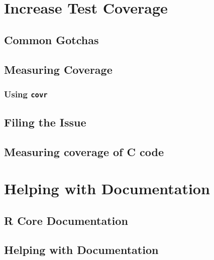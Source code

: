 \documentclass[]{book}
\begin{document}
\hypertarget{increase-test-coverage}{%
\chapter{Increase Test Coverage}\label{increase-test-coverage}}

\hypertarget{common-gotchas}{%
\section{Common Gotchas}\label{common-gotchas}}

\hypertarget{measuring-coverage}{%
\section{Measuring Coverage}\label{measuring-coverage}}

\hypertarget{using-covr}{%
\subsection{\texorpdfstring{Using \texttt{covr}}{Using covr}}\label{using-covr}}

\hypertarget{filing-the-issue}{%
\section{Filing the Issue}\label{filing-the-issue}}

\hypertarget{measuring-coverage-of-c-code}{%
\section{Measuring coverage of C code}\label{measuring-coverage-of-c-code}}

\hypertarget{helping-with-documentation}{%
\chapter{Helping with Documentation}\label{helping-with-documentation}}

\hypertarget{r-core-documentation}{%
\section{R Core Documentation}\label{r-core-documentation}}

\hypertarget{helping-with-documentation-1}{%
\section{Helping with Documentation}\label{helping-with-documentation-1}}
\end{document}
